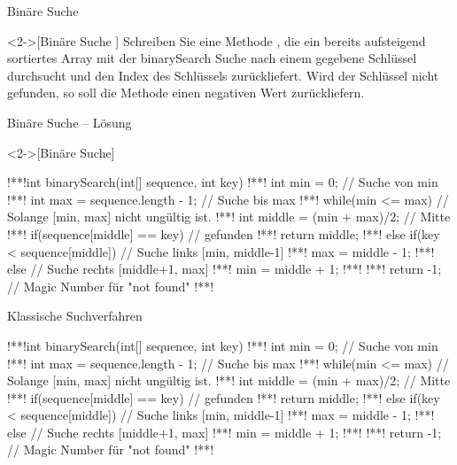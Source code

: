 \ifull
\begin{frame}[c]{Binäre Suche}
    \begin{exercise}<2->[Binäre Suche ]
        \pause{}Schreiben Sie eine Methode , die ein bereits aufsteigend sortiertes Array mit der binarySearch Suche nach einem gegebene Schlüssel durchsucht und den Index des Schlüssels zurückliefert.
        Wird der Schlüssel nicht gefunden, so soll die Methode einen negativen Wert zurückliefern.
    \end{exercise}
\end{frame}

\begin{frame}[fragile,c]{Binäre Suche -- Lösung}
    \begin{solve}<2->[Binäre Suche]
\begin{plainjava}
!**!int binarySearch(int[] sequence, int key){
!**!    int min = 0; // Suche von min
!**!    int max = sequence.length - 1; // Suche bis max
!**!    while(min <= max) { // Solange [min, max] nicht ungültig ist.
!**!        int middle = (min + max)/2; // Mitte
!**!        if(sequence[middle] == key) // gefunden
!**!            return middle;
!**!        else if(key < sequence[middle]) // Suche links [min, middle-1]
!**!            max = middle - 1;
!**!        else // Suche rechts [middle+1, max]
!**!            min = middle + 1;
!**!    }
!**!    return -1; // Magic Number für "not found"
!**!}
\end{plainjava}
    \end{solve}
\end{frame}
\else
\begin{frame}[fragile,c]{Klassische Suchverfahren}
    \begin{plainjava}
!**!int binarySearch(int[] sequence, int key){
!**!    int min = 0; // Suche von min
!**!    int max = sequence.length - 1; // Suche bis max
!**!    while(min <= max) { // Solange [min, max] nicht ungültig ist.
!**!        int middle = (min + max)/2; // Mitte
!**!        if(sequence[middle] == key) // gefunden
!**!            return middle;
!**!        else if(key < sequence[middle]) // Suche links [min, middle-1]
!**!            max = middle - 1;
!**!        else // Suche rechts [middle+1, max]
!**!            min = middle + 1;
!**!    }
!**!    return -1; // Magic Number für "not found"
!**!}
\end{plainjava}
\end{frame}
\fi



